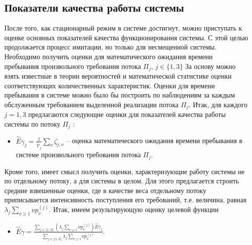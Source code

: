 \documentclass{report}
\begin{document}
\subsection{Показатели качества работы системы}
После того, как стационарный режим в системе достигнут, можно приступать к оценке основных показателей качества функционирования системы. С этой целью продолжается процесс имитации, но только для несмещенной системы. Необходимо получить оценки для математического ожидания времени пребывания произвольного требования потока $\Pi_j$, $j\in \{1, 3\}$
За основу можно взять известные в теории вероятностей и математической статистике оценки соответствующих количественных характеристик. Оценки для времени пребывания в системе можно было бы построить по наблюдениям за каждым обслуженным требованием выделенной реализации потока $\Pi_j$.
Итак, для каждого $j=1,3$  предлагаются следующие оценки для показателей качества работы системы по потоку $\Pi_j$ :
\begin{itemize}
    \item $\hat{E}\gamma_{j}=\frac{1}{\tilde{\mathcal{V}}_j}\sum_{\nu}\zeta_{j,\nu}$  -- оценка математического ожидания времени пребывания в системе произвольного требования потока $\Pi_j$.
\end{itemize}
Кроме того, имеет смысл получить оценки, характеризующие работу системы не по отдельному потоку, а для системы в целом. Для этого предлагается строить средние взвешенные оценки, где в качестве веса отдельному потоку  приписывается интенсивность поступления его требований, т.е. величина, равная $\lambda_j \sum_{\nu\geqslant1}\nu p_{\nu}^{(j)}$. Итак, имеем результирующую оценку целевой функции
\begin{itemize}
    \item $\hat{E}\gamma=\frac{\sum_{j\in\{1,3\}} (\lambda_j \sum_{\nu\geqslant1}\nu p_{\nu}^{(j)})\hat{E}\gamma_{j} }{\sum_{j\in\{1,3\}} \lambda_j \sum_{\nu\geqslant1}\nu p_{\nu}^{(j)}}$.
\end{itemize}
\end{document}
